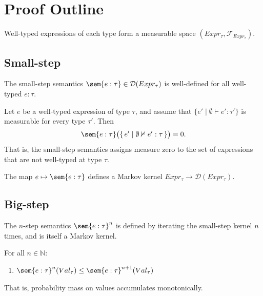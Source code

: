 \section{Proof Outline}

\begin{lemma}
  Well-typed expressions of each type form a measurable space $(Expr_\tau, \mathcal{F}_{Expr_{\tau}})$.
\end{lemma}

\subsection{Small-step}

\begin{lemma}
  The small-step semantics $\sem{e : \tau} \in \mathcal{D}(Expr_{\tau})$ is well-defined for all well-typed $e : \tau$.
\end{lemma}

\begin{lemma}
  Let $e$ be a well-typed expression of type $\tau$, and assume that
  $\{e' \mid \emptyset \vdash e' : \tau'\}$ is measurable for every type $\tau'$.
  Then
  \[
    \sem{e : \tau}\bigl(\{\,e' \mid \emptyset \nvdash e' : \tau\,\}\bigr) = 0.
  \]
  That is, the small-step semantics assigns measure zero to the set of
  expressions that are not well-typed at type $\tau$.
\end{lemma}

\begin{lemma}
  The map $e \mapsto \sem{e : \tau}$ defines a Markov kernel $Expr_\tau \to \mathcal{D}(Expr_\tau)$.
\end{lemma}

\subsection{Big-step}

\begin{lemma}
  The $n$-step semantics $\sem{e : \tau}^n$ is defined by iterating the small-step kernel $n$ times, and is itself a Markov kernel.
\end{lemma}

\begin{lemma}
  For all $n \in \mathbb{N}$:
  \begin{enumerate}
    \item $\sem{e : \tau}^n(Val_\tau) \leq \sem{e : \tau}^{n+1}(Val_\tau)$
  \end{enumerate}
  That is, probability mass on values accumulates monotonically.
\end{lemma}

